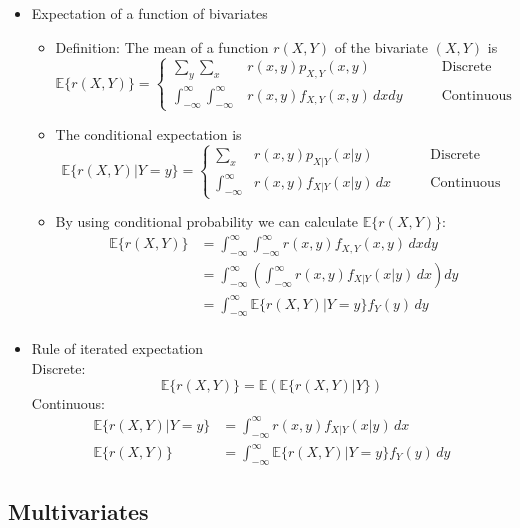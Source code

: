 \documentclass[12pt]{article}
\begin{document}
\begin{itemize}
\begin{itemize}
\end{itemize}
\item Expectation of a function of bivariates
\begin{itemize}
\item Definition: The mean of a function $r(X,Y)$ of the bivariate $(X,Y)$ is 
  \[
    \mathbb{E}\{r(X,Y)\}=\left\{
                \begin{array}{lll}
                  \sum_y\sum_x &r(x,y)p_{X,Y}(x,y)  \qquad &\textrm{Discrete}\\
                  \int_{-\infty}^{\infty}\int_{-\infty}^{\infty}&r(x,y)f_{X,Y}(x,y) \, dxdy \qquad &\textrm{Continuous}
                \end{array}
              \right.
  \]
\item The conditional expectation is
  \[
    \mathbb{E}\{r(X,Y)|Y=y\}=\left\{
                \begin{array}{lll}
                  \sum_x &r(x,y)p_{X|Y}(x|y)  \qquad &\textrm{Discrete}\\
                  \int_{-\infty}^{\infty}&r(x,y)f_{X|Y}(x|y) \, dx \qquad &\textrm{Continuous}
                \end{array}
              \right.
  \]
\item By using conditional probability we can calculate $\mathbb{E}  \{ r(X,Y) \}$:
\begin{align*}
\mathbb{E}\{r(X,Y)\} &= \int_{-\infty}^{\infty}\int_{-\infty}^{\infty}r(x,y)f_{X,Y}(x,y) \, dxdy \\
 &= \int_{-\infty}^{\infty} \left( \int_{-\infty}^{\infty}r(x,y)f_{X|Y}(x|y) \, dx \right) dy\\
 &= \int_{-\infty}^{\infty} \mathbb{E}\{r(X,Y)|Y=y\} f_Y(y) \, dy \\
\end{align*}

\end{itemize}
\item Rule of iterated expectation \\
Discrete:
\[
\mathbb{E}\{r(X,Y)\} = \mathbb{E}(\mathbb{E}\{r(X,Y)|Y\})
\]
Continuous:
\begin{align*}
\mathbb{E}\{r(X,Y)|Y=y\} &= \int_{-\infty}^{\infty} r(x,y)f_{X|Y}(x|y) \, dx \\
\mathbb{E}\{r(X,Y)\}&= \int_{-\infty}^{\infty}\mathbb{E}\{r(X,Y)|Y=y\} f_Y(y) \, dy
\end{align*}

\end{itemize}
\subsection{Multivariates}
\end{document}
